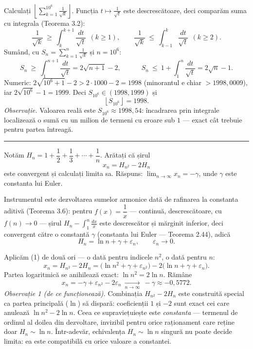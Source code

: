 Calculați $\left\lfloor\displaystyle\sum_{k=1}^{10^6}\frac1{\sqrt k}\right\rfloor$.
\sol Funcția $t\mapsto\frac1{\sqrt t}$ este descrescătoare, deci comparăm suma cu integrala (Teorema 3.2):
\[ \frac1{\sqrt k}\ \ge\ \int_k^{k+1}\frac{dt}{\sqrt t}\ \ (k\ge1),\qquad \frac1{\sqrt k}\ \le\ \int_{k-1}^{k}\frac{dt}{\sqrt t}\ \ (k\ge2). \]
Sumând, cu $S_n=\sum_{k=1}^n\frac1{\sqrt k}$ și $n=10^6$:
\[ S_n\ \ge\ \int_1^{n+1}\frac{dt}{\sqrt t}=2\sqrt{n+1}-2,\qquad\quad S_n\ \le\ 1+\int_1^{n}\frac{dt}{\sqrt t}=2\sqrt n-1 . \]
Numeric: $2\sqrt{10^6+1}-2>2\cdot1000-2=1998$ (minorantul e chiar $>1998{,}0009$), iar $2\sqrt{10^6}-1=1999$. Deci $S_{10^6}\in(1998,1999)$ și
\[ \left\lfloor S_{10^6}\right\rfloor=1998 . \]
\emph{Observație.} Valoarea reală este $S_{10^6}\approx1998{,}54$: încadrarea prin integrale localizează o sumă cu un milion de termeni cu eroare sub $1$ --- exact cât trebuie pentru partea întreagă.
\vspace{1mm}\hrule

Notăm $H_{n}=1+\dfrac12+\dfrac13+\cdots+\dfrac1n$. Arătați că șirul
\[ x_{n}=H_{n^{2}}-2H_{n} \]
este convergent și calculați limita sa.
\sol Răspuns: $\displaystyle\lim_{n\to\infty}x_{n}=-\gamma$, unde $\gamma$ este constanta lui Euler.

Instrumentul este dezvoltarea sumelor armonice dată de rafinarea la constanta aditivă (Teorema 3.6): pentru $f(x)=\dfrac1x$ --- continuă, descrescătoare, cu $f(n)\to0$ --- șirul $H_{n}-\displaystyle\int_{1}^{n}\frac{dx}{x}$ este descrescător și mărginit inferior, deci convergent către o constantă $\gamma$ (constanta lui Euler --- Teorema 2.44), adică
\[ H_{n}=\ln n+\gamma+\varepsilon_{n},\qquad \varepsilon_{n}\to0 . \tag{1} \]

Aplicăm (1) de două ori --- o dată pentru indicele $n^{2}$, o dată pentru $n$:
\[ x_{n}=H_{n^{2}}-2H_{n}=\bigl(\ln n^{2}+\gamma+\varepsilon_{n^{2}}\bigr)-2\bigl(\ln n+\gamma+\varepsilon_{n}\bigr) . \]
Partea logaritmică se anihilează exact: $\ln n^{2}=2\ln n$. Rămâne
\[ x_{n}=-\gamma+\varepsilon_{n^{2}}-2\varepsilon_{n}\ \xrightarrow[n\to\infty]{}\ -\gamma\approx-0{,}5772 . \]
\emph{Observație 1 (de ce funcționează).} Combinația $H_{n^{2}}-2H_{n}$ este construită special ca partea principală ($\ln$) să dispară: coeficienții $1$ și $-2$ sunt exact cei care anulează $\ln n^{2}-2\ln n$. Ceea ce supraviețuiește este \emph{constanta} --- termenul de ordinul al doilea din dezvoltare, invizibil pentru orice raționament care reține doar $H_{n}\sim\ln n$. Într-adevăr, echivalența $H_{n}\sim\ln n$ singură nu poate decide limita: ea este compatibilă cu orice valoare a constantei.

